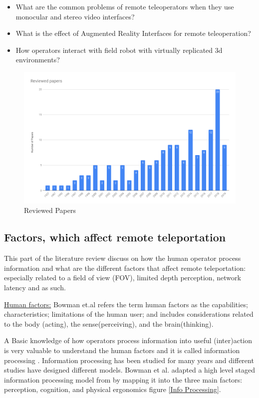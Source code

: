 \begin{itemize}
    \item What are the common problems of remote teleoperators when they use monocular and stereo video interfaces?
    \item What is the effect of Augmented Reality Interfaces for remote teleoperation?
    \item How operators interact with field robot with virtually replicated 3d environments?
\end{itemize}

\begin{figure}
     \includegraphics[scale=0.35]{images/Reviewed_papers.png}
    \caption{Reviewed Papers}
    \centering
    \label{Reviewed Papers}
\end{figure}

\subsection{Factors, which affect remote teleportation}

This part of the literature review discuss on how the human operator process information and what are the different factors that affect remote teleportation: especially related to a field of view (FOV), limited depth perception, network latency and as such.

\underline{Human factors:} Bowman et.al  \cite{Bowman:2004:UIT:993837} refers the term human factors as the capabilities; characteristics; limitations of the human user; and includes considerations related to the body (acting), the sense(perceiving), and the brain(thinking).

A Basic knowledge of how operators process information into useful (inter)action is very valuable to understand the human factors and it is called information processing \cite{Bowman:2004:UIT:993837}. Information processing has been studied for many years and different studies have designed different models. Bowman et al. \cite{Bowman:2004:UIT:993837} adapted a high level staged information processing model from \cite{PMID:11540969} by mapping it into the three main factors: perception, cognition, and physical ergonomics figure \ref{Info Processing}.


